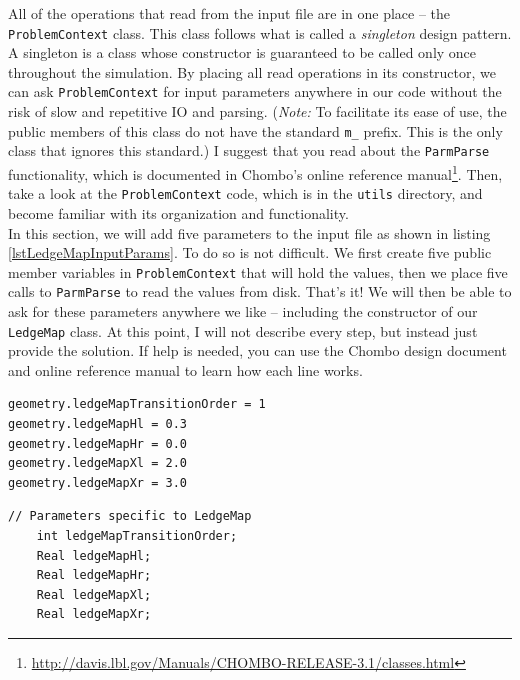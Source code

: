 \documentclass[12pt]{article}
\begin{document}
All of the operations that read from the input file are in one place -- the \texttt{ProblemContext} class. This class follows what is called a \textit{singleton} design pattern. A singleton is a class whose constructor is guaranteed to be called only once throughout the simulation. By placing all read operations in its constructor, we can ask \texttt{ProblemContext} for input parameters anywhere in our code without the risk of slow and repetitive IO and parsing. (\textit{Note:} To facilitate its ease of use, the public members of this class do not have the standard \texttt{m\_} prefix. This is the only class that ignores this standard.) I suggest that you read about the \texttt{ParmParse} functionality, which is documented in Chombo's online reference manual\footnote{\url{http://davis.lbl.gov/Manuals/CHOMBO-RELEASE-3.1/classes.html}}. Then, take a look at the \texttt{ProblemContext} code, which is in the \texttt{utils} directory, and become familiar with its organization and functionality.\\

In this section, we will add five parameters to the input file as shown in listing \ref{lstLedgeMapInputParams}. To do so is not difficult. We first create five public member variables in \texttt{ProblemContext} that will hold the values, then we place five calls to \texttt{ParmParse} to read the values from disk. That's it! We will then be able to ask for these parameters anywhere we like -- including the constructor of our \texttt{LedgeMap} class. At this point, I will not describe every step, but instead just provide the solution. If help is needed, you can use the Chombo design document and online reference manual to learn how each line works.

\begin{lstlisting}[caption={The five new input parameters that describe the ledge.},label=lstLedgeMapInputParams]
geometry.ledgeMapTransitionOrder = 1
geometry.ledgeMapHl = 0.3
geometry.ledgeMapHr = 0.0
geometry.ledgeMapXl = 2.0
geometry.ledgeMapXr = 3.0
\end{lstlisting}

\begin{lstlisting}[caption={\texttt{ProblemContext}'s new member variables. This should be placed in the public block under the \texttt{readGeometry()} declaration in \texttt{ProblemContext.H}.}]
	// Parameters specific to LedgeMap
	int ledgeMapTransitionOrder;
	Real ledgeMapHl;
	Real ledgeMapHr;
	Real ledgeMapXl;
	Real ledgeMapXr;
\end{lstlisting}
\end{document}
